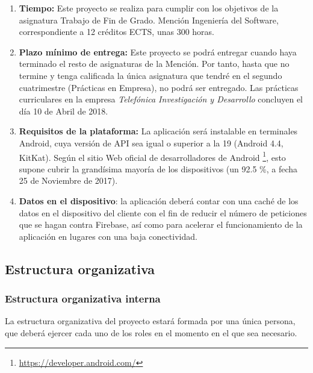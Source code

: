 \documentclass[twoside]{report}
\begin{document}
\begin{enumerate}
\item \textbf{Tiempo:} Este proyecto se realiza para cumplir con los objetivos de la asignatura Trabajo de Fin de Grado. Mención Ingeniería del Software, correspondiente a 12 créditos ECTS, unas 300 horas.

\item \textbf{Plazo mínimo de entrega:} Este proyecto se podrá entregar cuando haya terminado el resto de asignaturas de la Mención. Por tanto, hasta que no termine y tenga calificada la única asignatura que tendré en el segundo cuatrimestre (Prácticas en Empresa), no podrá ser entregado. Las prácticas curriculares en la empresa \textit{Telefónica Investigación y Desarrollo} concluyen el día 10 de Abril de 2018.

\item \textbf{Requisitos de la plataforma:} La aplicación será instalable en terminales Android, cuya versión de API sea igual o superior a la 19 (Android 4.4, KitKat). Según el sitio Web oficial de desarrolladores de Android \footnote{\url{https://developer.android.com/}}, esto supone cubrir la grandísima mayoría de los dispositivos (un 92.5 \%, a fecha 25 de Noviembre de 2017)\cite{androidversiondist}.

\item \textbf{Datos en el dispositivo}: la aplicación deberá contar con una caché de los datos en el dispositivo del cliente con el fin de reducir el número de peticiones que se hagan contra Firebase, así como para acelerar el funcionamiento de la aplicación en lugares con una baja conectividad.
\end{enumerate}

\subsection{Estructura organizativa}
\subsubsection{Estructura organizativa interna}
La estructura organizativa del proyecto estará formada por una única persona, que deberá ejercer cada uno de los roles en el momento en el que sea necesario. \cite{upedu} \vspace{0.5cm}
\end{document}
